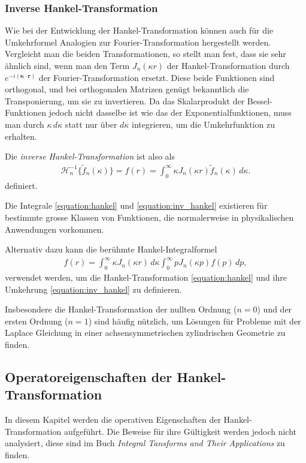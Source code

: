 \subsubsection{Inverse Hankel-Transformation
\label{subsub:inverse_hankel_tansformation}}
Wie bei der Entwicklung der Hankel-Transformation können auch für
die Umkehrformel Analogien zur Fourier-Transformation hergestellt
werden.
Vergleicht man die beiden Transformationen, so stellt man fest,
dass sie sehr ähnlich sind, wenn man den Term $J_n(\kappa r)$ der
Hankel-Transformation durch $e^{-i( \bm{\kappa}\cdot \mathbf{r})}$
der Fourier-Transformation ersetzt.
Diese beide Funktionen sind orthogonal, und bei orthogonalen Matrizen
genügt bekanntlich die Transponierung, um sie zu invertieren.
Da das Skalarprodukt der Bessel-Funktionen jedoch nicht dasselbe
ist wie das der Exponentialfunktionen, muss man durch $\kappa\,d\kappa$
statt nur über $d\kappa$ integrieren, um die Umkehrfunktion zu
erhalten.

Die {\em inverse Hankel-Transformation} ist also als 
%
%
\begin{align}
	\mathscr{H}^{-1}_n\{\tilde{f}_n(\kappa)\}
	=
	f(r)
	=
	\int_{0}^{\infty}\kappa J_n(\kappa r) \tilde{f}_n(\kappa) \, d\kappa.
	\label{equation:inv_hankel}
\end{align}
definiert.

Die Integrale \eqref{equation:hankel} und \eqref{equation:inv_hankel}
existieren für bestimmte grosse Klassen von Funktionen, die
normalerweise in physikalischen Anwendungen vorkommen.

Alternativ dazu kann die berühmte Hankel-Integralformel 
\begin{align*}
	f(r) = \int_{0}^{\infty}\kappa J_n(\kappa r) \, d\kappa \int_{0}^{\infty} p J_n(\kappa p)f(p) \, dp,
	\label{equation:hankel_integral_formula}
\end{align*}
verwendet werden, um die Hankel-Transformation \eqref{equation:hankel} und ihre Umkehrung \eqref{equation:inv_hankel} zu definieren.

Insbesondere die Hankel-Transformation der nullten Ordnung ($n=0$) und der ersten Ordnung ($n=1$) sind häufig nützlich, um Lösungen für Probleme mit der Laplace Gleichung in einer achsensymmetrischen zylindrischen Geometrie zu finden.

\subsection{Operatoreigenschaften der Hankel-Transformation
\label{sub:op_properties_hankel}}
In diesem Kapitel werden die operativen Eigenschaften der Hankel-Transformation aufgeführt.
Die Beweise für ihre Gültigkeit werden jedoch nicht analysiert, diese sind im Buch {\em Integral Tansforms and Their Applications} \cite{lokenath_debnath_integral_2015} zu finden.


